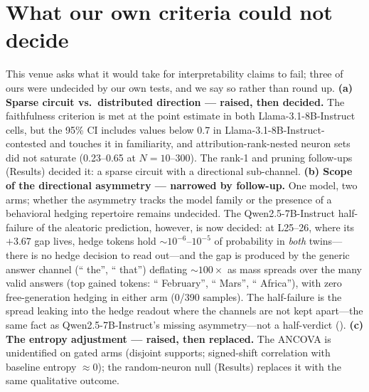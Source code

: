 \documentclass{article}
\newcommand{\lm}{Llama-3.1-8B-Instruct}
\newcommand{\qw}{Qwen2.5-7B-Instruct}
\begin{document}
\section{What our own criteria could not decide}
\label{sec:undecided}
This venue asks what it would take for interpretability claims to fail; three of ours were undecided by our
own tests, and we say so rather than round up.
\textbf{(a) Sparse circuit vs.\ distributed direction --- raised, then decided.} The faithfulness criterion
is met at the point estimate in both \lm{} cells, but the 95\% CI includes values below 0.7 in
\lm{}-contested and touches it in familiarity, and attribution-rank-nested neuron sets did not saturate
(0.23--0.65 at $N{=}10$--$300$). The rank-1 and pruning follow-ups (Results) decided it: a sparse circuit
with a directional sub-channel.
\textbf{(b) Scope of the directional asymmetry --- narrowed by follow-up.} One model, two arms; whether
the asymmetry tracks the model family or the presence of a behavioral hedging repertoire remains
undecided. The \qw{} half-failure of the aleatoric prediction, however, is now decided: at L25--26, where
its $+3.67$ gap lives, hedge tokens hold ${\sim}10^{-6}$--$10^{-5}$ of probability in \emph{both}
twins---there is no hedge decision to read out---and the gap is produced by the generic answer channel
(`` the'', `` that'') deflating ${\sim}100\times$ as mass spreads over the many valid answers (top gained
tokens: `` February'', `` Mars'', `` Africa''), with zero free-generation hedging in either arm (0/390
samples). The half-failure is the spread leaking into the hedge readout where the channels are not kept
apart---the same fact as \qw{}'s missing asymmetry---not a half-verdict
().
\textbf{(c) The entropy adjustment --- raised, then replaced.} The ANCOVA is unidentified on gated arms
(disjoint supports; signed-shift correlation with baseline entropy $\approx 0$); the random-neuron null
(Results) replaces it with the same qualitative outcome.
\end{document}
